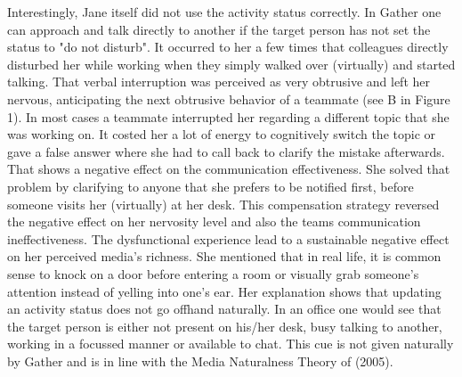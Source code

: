 \documentclass[man]{apa7}
\begin{document}
Interestingly, Jane itself did not use the activity status correctly. In Gather one can approach and talk directly to another if the target person has not set the status to "do not disturb". It occurred to her a few times that colleagues directly disturbed her while working when they simply walked over (virtually) and started talking. That verbal interruption was perceived as very obtrusive and left her nervous, anticipating the next obtrusive behavior of a teammate (see B in Figure 1). In most cases a teammate interrupted her regarding a different topic that she was working on. It costed her a lot of energy to cognitively switch the topic or gave a false answer where she had to call back to clarify the mistake afterwards. That shows a negative effect on the communication effectiveness. She solved that problem by clarifying to anyone that she prefers to be notified first, before someone visits her (virtually) at her desk. This compensation strategy reversed the negative effect on her nervosity level and also the teams communication ineffectiveness. The dysfunctional experience lead to a sustainable negative effect on her perceived media's richness. She mentioned that in real life, it is common sense to knock on a door before entering a room or visually grab someone's attention instead of yelling into one's ear. Her explanation shows that updating an activity status does not go offhand naturally. In an office one would see that the target person is either not present on his/her desk, busy talking to another, working in a focussed manner or available to chat. This cue is not given naturally by Gather and is in line with the Media Naturalness Theory of \citeauthor{Kock2005} (2005).
\end{document}
